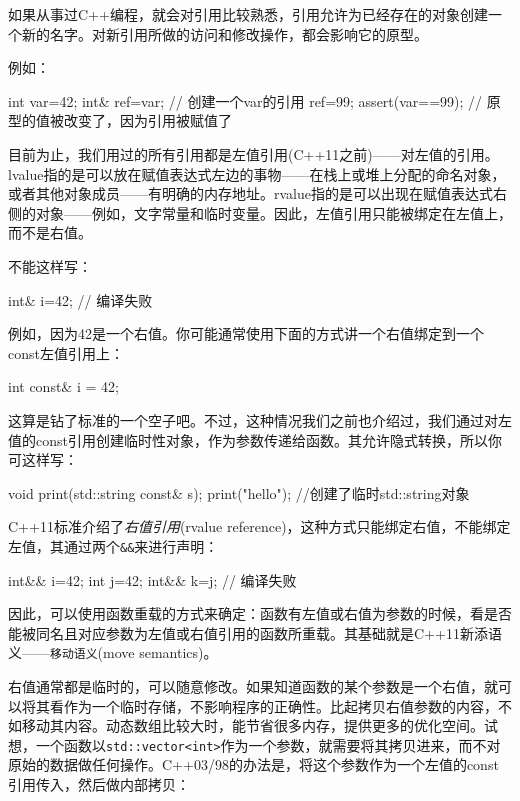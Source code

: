 
如果从事过C++编程，就会对引用比较熟悉，引用允许为已经存在的对象创建一个新的名字。对新引用所做的访问和修改操作，都会影响它的原型。

例如：

\begin{cpp}
int var=42;
int& ref=var;  // 创建一个var的引用
ref=99;
assert(var==99);  // 原型的值被改变了，因为引用被赋值了
\end{cpp}

目前为止，我们用过的所有引用都是左值引用(C++11之前)——对左值的引用。lvalue指的是可以放在赋值表达式左边的事物——在栈上或堆上分配的命名对象，或者其他对象成员——有明确的内存地址。rvalue指的是可以出现在赋值表达式右侧的对象——例如，文字常量和临时变量。因此，左值引用只能被绑定在左值上，而不是右值。

不能这样写：

\begin{cpp}
int& i=42;  // 编译失败
\end{cpp}

例如，因为42是一个右值。你可能通常使用下面的方式讲一个右值绑定到一个const左值引用上：

\begin{cpp}
int const& i = 42;
\end{cpp}

这算是钻了标准的一个空子吧。不过，这种情况我们之前也介绍过，我们通过对左值的const引用创建临时性对象，作为参数传递给函数。其允许隐式转换，所以你可这样写：

\begin{cpp}
void print(std::string const& s);
print("hello");  //创建了临时std::string对象
\end{cpp}

C++11标准介绍了\textit{右值引用}(rvalue reference)，这种方式只能绑定右值，不能绑定左值，其通过两个\texttt{\&\&}来进行声明：

\begin{cpp}
int&& i=42;
int j=42;
int&& k=j;  // 编译失败
\end{cpp}

因此，可以使用函数重载的方式来确定：函数有左值或右值为参数的时候，看是否能被同名且对应参数为左值或右值引用的函数所重载。其基础就是C++11新添语义——\texttt{移动语义}(move semantics)。


右值通常都是临时的，可以随意修改。如果知道函数的某个参数是一个右值，就可以将其看作为一个临时存储，不影响程序的正确性。比起拷贝右值参数的内容，不如移动其内容。动态数组比较大时，能节省很多内存，提供更多的优化空间。试想，一个函数以\texttt{std::vector<int>}作为一个参数，就需要将其拷贝进来，而不对原始的数据做任何操作。C++03/98的办法是，将这个参数作为一个左值的const引用传入，然后做内部拷贝：

